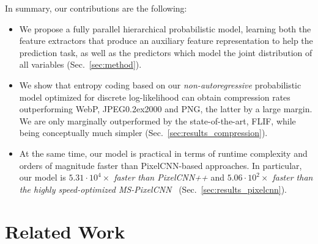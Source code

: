 \documentclass[10pt,twocolumn,letterpaper]{article}
\newcommand{\jpegk}{JPEG\kern0.2ex2000\xspace}
\begin{document}
In summary, our contributions are the following:
\begin{itemize}[leftmargin=*]
    \item We propose a fully parallel hierarchical probabilistic model, learning both the feature extractors that produce an auxiliary feature representation to help the prediction task, as well as the predictors which model the joint distribution of all variables (Sec.~\ref{sec:method}).
    \item We show that entropy coding based on our \emph{non-autoregressive} probabilistic model optimized for discrete log-likelihood can obtain compression rates outperforming WebP, \jpegk and PNG, the latter by a large margin. We are only marginally outperformed by the state-of-the-art, FLIF, while being conceptually much simpler (Sec.~\ref{sec:results_compression}).
    \item At the same time, our model is practical in terms of runtime complexity and orders of magnitude faster than PixelCNN-based approaches. In particular, our model is \emph{$5.31\cdot10^4\times$ faster than PixelCNN++}\cite{Salimans2017pcnnpp} and \emph{$5.06\cdot10^2\times$ faster than the highly speed-optimized MS-PixelCNN}~\cite{reed2017parallel} 
    (Sec.~\ref{sec:results_pixelcnn}).
\end{itemize}

\section{Related Work} \label{sec:related_work}
\end{document}
